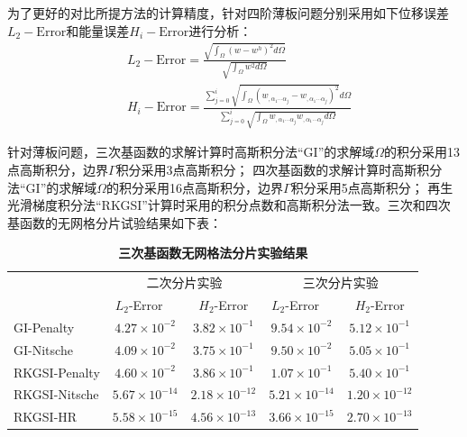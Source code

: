 为了更好的对比所提方法的计算精度，针对四阶薄板问题分别采用如下位移误差$L_2-\text{Error}$和能量误差$H_i-\text{Error}$进行分析：
\begin{equation}
\begin{split}
    &L_2-\text{Error}=\frac{\sqrt{\int_{\Omega}(w-w^h)^2d\Omega}}{\sqrt{\int_{\Omega}w^2d\Omega}}\\
    &H_i-\text{Error}=\frac{\sum_{j=0}^{i}\sqrt{\int_{\Omega}(w_{,\alpha_1\dotsb \alpha_j}-w_{,\alpha_1\dotsb \alpha_j})^2}d\Omega}{\sum_{j=0}^{i}\sqrt{\int_{\Omega}w_{,\alpha_1\dotsb \alpha_j}w_{,\alpha_1\dotsb \alpha_j}d\Omega}}
\end{split}
\end{equation}\par
针对薄板问题，三次基函数的求解计算时高斯积分法“GI”的求解域$\Omega$的积分采用13点高斯积分，边界$\Gamma$积分采用3点高斯积分；
四次基函数的求解计算时高斯积分法“GI”的求解域$\Omega$的积分采用16点高斯积分，边界$\Gamma$积分采用5点高斯积分；
再生光滑梯度积分法“RKGSI”计算时采用的积分点数和高斯积分法一致。三次和四次基函数的无网格分片试验结果如下表：
\begin{table}[H]
    \caption{\textbf{三次基函数无网格法分片实验结果}}
    \centering\label{cubic}
   \begin{tabular}{lcccc}
   \toprule
   & \multicolumn{2}{c}{二次分片实验} & \multicolumn{2}{c}{三次分片实验} \\ \cline{2-5}
   &$L_2$-Error$\quad$&$H_2$-Error&$L_2$-Error$\quad$&$H_2$-Error\\
   \midrule
   GI-Penalty&$4.27\times10^{-2}$&$3.82\times10^{-1}$&$9.54\times10^{-2}$&$5.12\times10^{-1}$\\
   GI-Nitsche&$4.09\times10^{-2}$&$3.75\times10^{-1}$&$9.50\times10^{-2}$&$5.05\times10^{-1}$\\
  RKGSI-Penalty&$4.60\times10^{-2}$&$3.86\times10^{-1}$&$1.07\times10^{-1}$&$5.40\times10^{-1}$\\
  RKGSI-Nitsche&$5.67\times10^{-14}$&$2.18\times10^{-12}$&$5.21\times10^{-14}$&$1.20\times10^{-12}$\\
  RKGSI-HR&$5.58\times10^{-15}$&$4.56\times10^{-13}$&$3.66\times10^{-15}$&$2.70\times10^{-13}$\\
   \bottomrule
   \end{tabular}
   \end{table}
